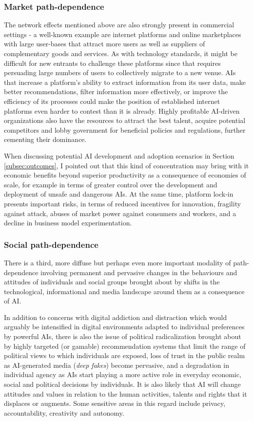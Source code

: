 \documentclass[11pt]{article}
\begin{document}
\subsubsection*{Market path-dependence}
\label{subsec:business}
The network effects mentioned above are also strongly present in commercial settings - a well-known example are internet platforms and online marketplaces with large user-bases that attract more users as well as suppliers of complementary goods and services. As with technology standards, it might be difficult for new entrants to challenge these platforms since that requires persuading large numbers of users to collectively migrate to a new venue. AIs that increase a platform's ability to extract information from its user data, make better recommendations, filter information more effectively, or improve the efficiency of its processes could make the position of established internet platforms even harder to contest than it is already. Highly profitable AI-driven organizations also have the resources to attract the best talent, acquire potential competitors and lobby government for beneficial policies and regulations,  further cementing their dominance. 

When discussing potential AI development and adoption scenarios in Section \ref{subsec:outcomes}, I pointed out that this kind of concentration may bring with it economic benefits beyond superior productivity as a consequence of economies of scale, for example in terms of greater control over the development and deployment of unsafe and dangerous AIs. At the same time, platform lock-in presents important risks, in terms of reduced incentives for innovation, fragility against attack, abuses of market power against consumers  and workers, and a decline in business model experimentation.

\subsubsection*{Social path-dependence}
\label{subsec:social_lock}
There is a third, more diffuse but perhaps even more important modality of path-dependence involving permanent and pervasive changes in the behaviours and attitudes of individuals and social groups brought about by shifts  in the technological, informational and media landscape around them as a consequence of AI. 

In addition to concerns with digital addiction and distraction which would arguably be intensified in digital environments adapted to individual preferences by powerful AIs, there is also the issue of political radicalization brought about by highly targeted (or gamable) recommendation systems that limit the range of political views to which individuals are exposed, loss of trust in the public realm as AI-generated media (\textit{deep fakes}) become pervasive, and a degradation in individual agency as AIs start playing a more active role in everyday economic, social and political decisions by individuals. It is also likely that AI will change attitudes and values in relation to the human activities, talents and rights that it displaces or augments.  Some sensitive areas in this regard include privacy, accountability, creativity and autonomy. 
\end{document}
